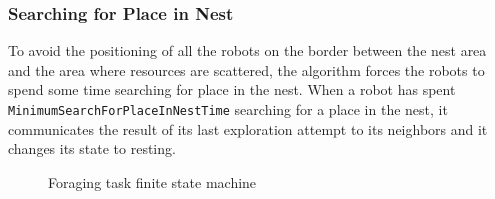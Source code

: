 \documentclass[../../Thesis.tex]{subfiles}
\begin{document}
			\subsubsection{Searching for Place in Nest}
				To avoid the positioning of all the robots on the border between the nest area and the area where resources are scattered, the algorithm forces the robots to spend some time searching for place in the nest.  When a robot has spent \verb|MinimumSearchForPlaceInNestTime| searching for a place in the nest, it communicates the result of its last exploration attempt to its neighbors and it changes its state to resting. 
			\begin{figure}
			    \centering %
			    \caption{Foraging task finite state machine}
			    \label{fig:fore_FSM}
			\end{figure}
		
\end{document}
